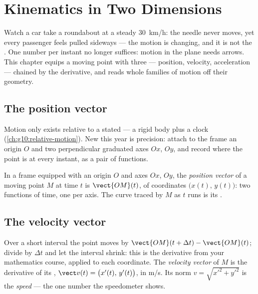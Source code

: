 \chapter{Kinematics in Two Dimensions}\label{ch:g12:kinematics-2d}

Watch a car take a roundabout at a steady \qty{30}{km/h}: the needle
never moves, yet every passenger feels pulled sideways --- the motion
is changing, and it is not the . One number per instant no
longer suffices: motion in the plane needs arrows. This chapter
equips a moving point with three --- position, velocity, acceleration
--- chained by the derivative, and reads whole families of motion off
their geometry.

\section{The position vector}

Motion only exists relative to a stated  --- a rigid
body plus a clock (\cref{ch:g10:relative-motion}). New this year is
precision: attach to the frame an origin $O$ and two perpendicular
graduated axes $Ox$, $Oy$, and record where the point is at every
instant, as a pair of functions.

\begin{definition}\label{def:g12:kinematics-2d:position}
In a frame equipped with an origin $O$ and axes $Ox$, $Oy$, the
\emph{position vector} of a moving point $M$
at time $t$ is $\vect{OM}(t)$, of coordinates
$\bigl(x(t),\, y(t)\bigr)$: two functions of time, one per axis. The
curve traced by $M$ as $t$ runs is its .
\end{definition}

\section{The velocity vector}

\begin{definition}\label{def:g12:kinematics-2d:velocity}
Over a short interval the point moves by
$\vect{OM}(t+\Delta t) - \vect{OM}(t)$; divide by $\Delta t$ and let
the interval shrink: this is the derivative from your mathematics
course, applied to each coordinate. The \emph{velocity
vector} of $M$ is the derivative of its
, $\vect v(t) = \bigl(x'(t),\, y'(t)\bigr)$, in
\unit{m/s}. Its norm $v = \sqrt{x'^2 + y'^2}$ is the
\emph{speed} --- the one number the speedometer shows.
\end{definition}

